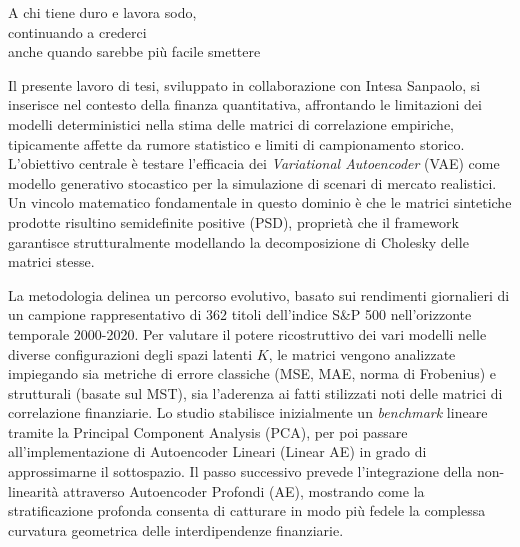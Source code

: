 \documentclass[twoside,greek]{toptesi}
\makeatletter
\newlength{\dedicalarghezza}
\renewenvironment{dedica}{\clearpage
    \if@twoside
        \ifodd\c@page\else\thispagestyle{empty}\null\clearpage\fi
    \fi
    \thispagestyle{empty}%
    \list{}{\labelwidth\z@
    \leftmargin\dimexpr\textwidth-\dedicalarghezza-1pt\relax
    \parindent\z@
    \raggedright\LARGE\itshape}\item[]
}{%
    \endlist\clearpage
}
\makeatother
\begin{document}


\ifclassica%
\begin{dedica}
    A chi tiene duro e lavora sodo,\\
    \vspace{0.5em}
    continuando a crederci\\
    anche quando sarebbe più facile smettere
\end{dedica}
\fi

\sommario%
Il presente lavoro di tesi, sviluppato in collaborazione con Intesa Sanpaolo, si inserisce nel contesto della finanza quantitativa, affrontando le limitazioni dei modelli deterministici nella stima delle matrici di correlazione empiriche, tipicamente affette da rumore statistico e limiti di campionamento storico. L'obiettivo centrale è testare l'efficacia dei \emph{Variational Autoencoder} (VAE) come modello generativo stocastico per la simulazione di scenari di mercato realistici. Un vincolo matematico fondamentale in questo dominio è che le matrici sintetiche prodotte risultino semidefinite positive (PSD), proprietà che il framework garantisce strutturalmente modellando la decomposizione di Cholesky delle matrici stesse.

La metodologia delinea un percorso evolutivo, basato sui rendimenti giornalieri di un campione rappresentativo di 362 titoli dell'indice S\&P 500 nell'orizzonte temporale 2000-2020. Per valutare il potere ricostruttivo dei vari modelli nelle diverse configurazioni degli spazi latenti $K$, le matrici vengono analizzate impiegando sia metriche di errore classiche (MSE, MAE, norma di Frobenius) e strutturali (basate sul MST), sia l'aderenza ai fatti stilizzati noti delle matrici di correlazione finanziarie. Lo studio stabilisce inizialmente un \emph{benchmark} lineare tramite la Principal Component Analysis (PCA), per poi passare all'implementazione di Autoencoder Lineari (Linear AE) in grado di approssimarne il sottospazio. Il passo successivo prevede l'integrazione della non-linearità attraverso Autoencoder Profondi (AE), mostrando come la stratificazione profonda consenta di catturare in modo più fedele la complessa curvatura geometrica delle interdipendenze finanziarie.
\end{document}
